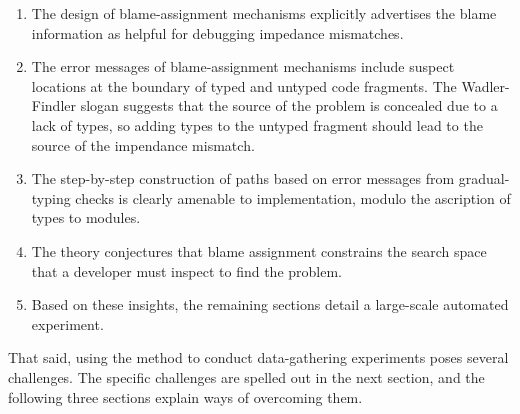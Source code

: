 \begin{enumerate}

\item The design of blame-assignment mechanisms explicitly advertises the blame
information as helpful for debugging impedance mismatches.

\item The error messages of blame-assignment mechanisms include suspect
locations at the boundary of typed and untyped code fragments.
The Wadler-Findler slogan suggests that the source of the problem is concealed due to a lack of types, so
adding types to the untyped fragment should lead to the source of the impendance mismatch.

\item The step-by-step construction of paths based on error messages from
gradual-typing checks is clearly amenable to implementation, modulo the
ascription of types to modules.

\item The theory conjectures that blame assignment constrains the search
space that a developer must inspect to find the problem.

\item Based on these insights, the remaining sections detail a large-scale automated experiment.

\end{enumerate}
That said, using the method to conduct data-gathering experiments poses
several challenges. The specific challenges are spelled out in the next section,
and the following three sections explain ways of overcoming them.
